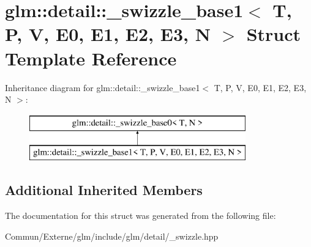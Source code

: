 \hypertarget{structglm_1_1detail_1_1__swizzle__base1}{}\section{glm\+:\+:detail\+:\+:\+\_\+swizzle\+\_\+base1$<$ T, P, V, E0, E1, E2, E3, N $>$ Struct Template Reference}
\label{structglm_1_1detail_1_1__swizzle__base1}
Inheritance diagram for glm\+:\+:detail\+:\+:\+\_\+swizzle\+\_\+base1$<$ T, P, V, E0, E1, E2, E3, N $>$\+:\begin{figure}[H]
\begin{center}
\leavevmode
\includegraphics[height=2.000000cm]{structglm_1_1detail_1_1__swizzle__base1}
\end{center}
\end{figure}
\subsection*{Additional Inherited Members}


The documentation for this struct was generated from the following file\+:\begin{DoxyCompactItemize}
\item 
Commun/\+Externe/glm/include/glm/detail/\+\_\+swizzle.\+hpp\end{DoxyCompactItemize}

